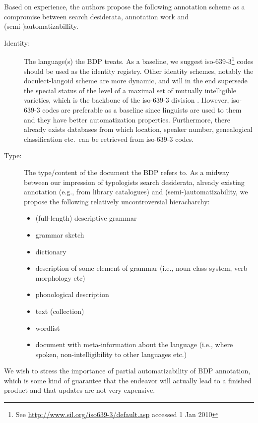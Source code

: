 \documentclass[english,11pt,twoside]{article}
\begin{document}
Based on experience, the authors propose the following annotation
scheme as a compromise between search desiderata, annotation work and
(semi-)automatizabillity.
\begin{description}
\item[Identity:] The language(s) the BDP treats. As a baseline, we
  suggest iso-639-3\footnote{See
    \url{http://www.sil.org/iso639-3/default.asp} accessed 1 Jan 2010}
  codes should be used as the identity registry. Other identity
  schemes, notably the doculect-langoid scheme
  \citet{ling:CysouwGood:Langoid,ling:GoodHendryx:Categorization} are
  more dynamic, and will in the end supersede the special status of
  the level of a maximal set of mutually intelligible varieties, which
  is the backbone of the iso-639-3 division
  \citep[7-18]{h:Ethnologue:16}. However, iso-639-3 codes are
  preferable as a baseline since linguists are used to them and they
  have better automatization properties. Furthermore, there already
  exists databases from which location, speaker number, genealogical
  classification etc.~can be retrieved from iso-639-3 codes.
\item[Type:] The type/content of the document the BDP refers to. As a
  midway between our impression of typologists search desiderata,
  already existing annotation (e.g., from library catalogues) and
  (semi-)automatizability, we propose the following relatively
  uncontroversial hieracharchy:
  \begin{itemize}
\item  (full-length) descriptive grammar
\item  grammar sketch
\item  dictionary
\item  description of some element of grammar (i.e., noun class system, verb morphology etc)
\item  phonological description
\item  text (collection)
\item  wordlist
\item  document with meta-information about the language (i.e., where spoken, non-intelligibility to other languages etc.)
\end{itemize}
\end{description}

We wish to stress the importance of partial automatizability of BDP
annotation, which is some kind of guarantee that the endeavor will
actually lead to a finished product and that updates are not very
expensive. 
\end{document}
